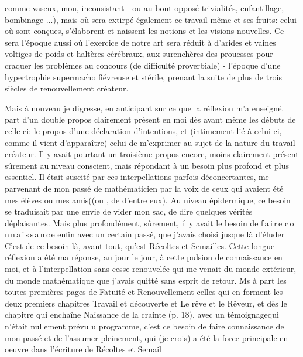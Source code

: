  comme vaseux, mou, inconsistant - ou au bout opposé  trivialités, enfantillage, bombinage ...), mais où sera extirpé également ce travail même et ses fruits: celui où sont conçues, s'élaborent et naissent les notions et les visions nouvelles. Ce sera l'époque aussi où l'exercice de notre art sera réduit à d'arides et vaines voltiges de poids et haltères cérébraux, aux surenchères des prouesses pour craquer les problèmes au concours (de difficulté proverbiale) - l'époque d'une hypertrophie supermacho fiévreuse et stérile, prenant la suite de plus de trois siècles de renouvellement créateur.

 Mais à nouveau je digresse, en anticipant sur ce que la réflexion m'a enseigné.  part d'un double propos\handwritten{,} clairement présent en moi dès avant même les débuts de celle-ci: le propos d'une déclaration d'intentions, et (intimement lié à celui-ci, comme il vient d'apparaître) celui de m'exprimer au sujet de la nature du travail créateur. Il y avait pourtant un troisième propos encore, moins clairement présent sûrement au niveau conscient, mais répondant à un besoin plus profond et plus essentiel. Il était suscité par ces interpellations parfois déconcertantes, me parvenant de mon passé de mathématicien par la voix de ceux qui avaient été mes élèves ou mes amis((ou , de  d'entre eux). Au niveau épidermique, ce besoin se traduisait par une envie de vider mon sac, de dire quelques vérités déplaisantes. Mais plus profondément, sûrement, il y avait le besoin de  \mbox{f\,a\,i\,r\,e} \mbox{c\,o\,n\,n\,a\,i\,s\,s\,a\,n\,c\,e} enfin avec un certain passé, que j'avais choisi jusque là d'éluder
C'est de ce besoin-là, avant tout, qu'est  Récoltes et Semailles. Cette longue réflexion a été ma réponse, au jour le jour, à cette pulsion de connaissance en moi, et à l'interpellation sans cesse renouvelée qui me venait du monde extérieur, du monde mathématique que j'avais quitté sans esprit de retour. Ms à part les toutes premières pages de Fatuité et Renouvellement \deleted{\unsure{,}}\handwritten{(}celles qui en forment les deux premiers chapitres Travail et découverte et Le rêve et le Rêveur\deleted{\unsure{,}}\handwritten{)}, et dès le chapitre qui enchaîne Naissance de la crainte (p. 18), avec un témoignagequi n'était nullement prévu u programme, c'est ce besoin de faire connaissance de mon passé et de l'assumer pleinement, qui (je crois) a été la force principale en oeuvre dans l'écriture de Récoltes et Semail 

